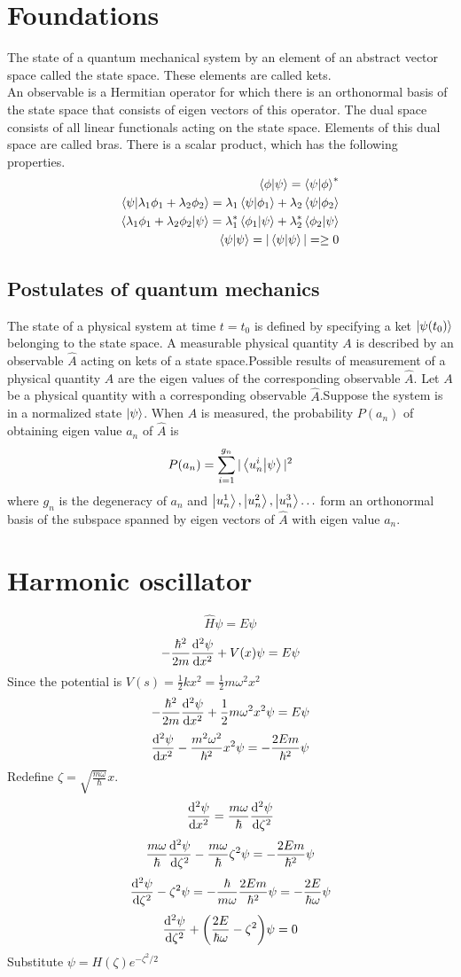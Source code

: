 \documentclass[12pt]{article}
\begin{document}
\section{Foundations}
The state of a quantum mechanical system by an element of an abstract vector space called the state space. These elements are called kets.\\
An observable is a Hermitian operator for which there is an orthonormal basis of the state space that consists of eigen vectors of this operator. 
The dual space consists of all linear functionals acting on the state space. Elements of this dual space are called bras.
There is a scalar product, which has the following properties.
\begin{align*}
\braket{\phi}{\psi}=\braket{\psi}{\phi}^*\\
\braket{\psi}{\lambda_1\phi_1+\lambda_2\phi_2}=\lambda_1\braket{\psi}{\phi_1}+\lambda_2\braket{\psi}{\phi_2}\\
\braket{\lambda_1\phi_1+\lambda_2\phi_2}{\psi}=\lambda_1^*\braket{\phi_1}{\psi}+\lambda_2^*\braket{\phi_2}{\psi}\\
\braket{\psi}{\psi}=|\braket{\psi}{\psi}|=\geq 0
\end{align*}
\subsection*{Postulates of quantum mechanics}
The state of a physical system at time $t=t_0$ is defined by specifying a ket $\ket{\psi(t_0)}$ belonging to the state space.
A measurable physical quantity $A$ is described by an observable $\hat{A}$ acting on kets of a state space.Possible results of measurement of a physical quantity $A$ are the eigen values of the corresponding observable $\hat{A}$.
Let $A$ be a physical quantity with a corresponding observable $\hat{A}$.Suppose the system is in a normalized state $\ket{\psi}$. When $A$ is measured, the probability $P(a_n)$ of obtaining eigen value $a_n$ of $\hat{A}$ is \[P(a_n)=\sum_{i=1}^{g_n}|\braket{u^i_n}{\psi}|^2\] where $g_n$ is the degeneracy of $a_n$ and $\ket{u_n^1},\ket{u_n^2},\ket{u_n^3}\ldots$ form an orthonormal basis of the subspace spanned by eigen vectors of $\hat{A}$ with eigen value $a_n$.
\section{Harmonic oscillator}
\[\hat{H}\psi=E\psi\]
\[-\frac{\hbar^2}{2m}\dv[2]{\psi}{x}+V(x)\psi=E\psi\]
Since the potential is $V(s)=\frac{1}{2}kx^2=\frac{1}{2}m\omega^2x^2$
\[-\frac{\hbar^2}{2m}\dv[2]{\psi}{x}+\frac{1}{2}m\omega^2x^2\psi=E\psi\]
\[\dv[2]{\psi}{x}-\frac{m^2\omega^2}{\hbar^2}x^2\psi=-\frac{2Em}{\hbar^2}\psi\]
Redefine $\zeta=\sqrt{\frac{m\omega}{\hbar}}x$.
\[\dv[2]{\psi}{x}=\frac{m\omega}{\hbar}\dv[2]{\psi}{\zeta}\]
\[\frac{m\omega}{\hbar}\dv[2]{\psi}{\zeta}-\frac{m\omega}{\hbar}\zeta^2\psi=-\frac{2Em}{\hbar^2}\psi\]
\[\dv[2]{\psi}{\zeta}-\zeta^2\psi=-\frac{\hbar}{m\omega}\frac{2Em}{\hbar^2}\psi=-\frac{2E}{\hbar\omega}\psi\]
\[\dv[2]{\psi}{\zeta}+\qty(\frac{2E}{\hbar\omega}-\zeta^2)\psi=0\]
Substitute $\psi=H(\zeta)e^{-\zeta^2/2}$	
\end{document}
